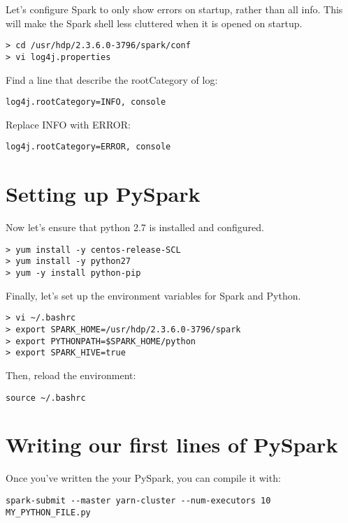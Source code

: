 \documentclass[9pt,twocolumn,twoside]{idsi}
\begin{document}
Let's configure Spark to only show errors on startup, rather than all info. This will make the Spark shell less cluttered when it is opened on startup.
\begin{verbatim}
> cd /usr/hdp/2.3.6.0-3796/spark/conf
> vi log4j.properties
\end{verbatim}

Find a line that describe the rootCategory of log:
\begin{verbatim}
log4j.rootCategory=INFO, console
\end{verbatim}

Replace INFO with ERROR:
\begin{verbatim}
log4j.rootCategory=ERROR, console
\end{verbatim}

\section{Setting up PySpark}

Now let's ensure that python 2.7 is installed and configured.
\begin{verbatim}
> yum install -y centos-release-SCL
> yum install -y python27
> yum -y install python-pip
\end{verbatim}

Finally, let's set up the environment variables for Spark and Python.
\begin{verbatim}
> vi ~/.bashrc
> export SPARK_HOME=/usr/hdp/2.3.6.0-3796/spark
> export PYTHONPATH=$SPARK_HOME/python
> export SPARK_HIVE=true
\end{verbatim}

Then, reload the environment:
\begin{verbatim}
source ~/.bashrc
\end{verbatim}

\section{Writing our first lines of PySpark}

Once you've written the your PySpark, you can compile it with:
\begin{verbatim}
spark-submit --master yarn-cluster --num-executors 10 MY_PYTHON_FILE.py
\end{verbatim}
\end{document}
